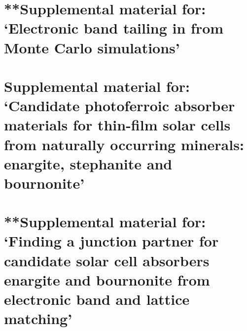 \documentclass[11pt, twoside]{report}
\begin{document}
\section{**Supplemental material for: `Electronic band tailing in {\CZTS} from Monte Carlo simulations'}

\section{Supplemental material for: `Candidate photoferroic absorber materials for thin-film solar cells from naturally occurring minerals: enargite, stephanite and bournonite'}



\section{**Supplemental material for: `Finding a junction partner for candidate solar cell absorbers enargite and bournonite from electronic band and lattice matching'}



\end{document}
